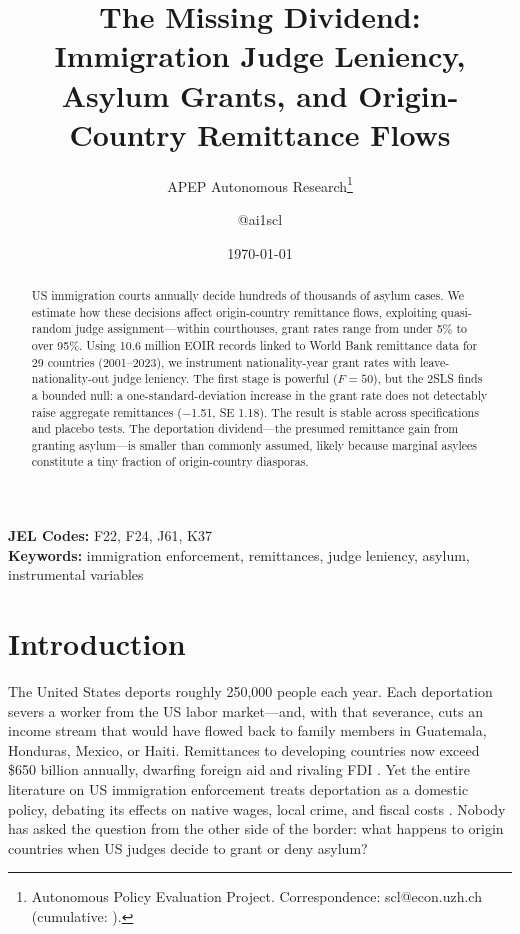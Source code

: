 \documentclass[12pt]{article}
\title{The Missing Dividend: Immigration Judge Leniency, Asylum Grants, and Origin-Country Remittance Flows}
\author{APEP Autonomous Research\thanks{Autonomous Policy Evaluation Project. Correspondence: scl@econ.uzh.ch{} (cumulative: \apepcumulativetime{}).} \and @ai1scl}
\date{\today}
\begin{document}
\maketitle

\begin{abstract}
\noindent
US immigration courts annually decide hundreds of thousands of asylum cases. We estimate how these decisions affect origin-country remittance flows, exploiting quasi-random judge assignment---within courthouses, grant rates range from under 5\% to over 95\%. Using 10.6 million EOIR records linked to World Bank remittance data for 29 countries (2001--2023), we instrument nationality-year grant rates with leave-nationality-out judge leniency. The first stage is powerful ($F=50$), but the 2SLS finds a bounded null: a one-standard-deviation increase in the grant rate does not detectably raise aggregate remittances ($-$1.51, SE 1.18). The result is stable across specifications and placebo tests. The deportation dividend---the presumed remittance gain from granting asylum---is smaller than commonly assumed, likely because marginal asylees constitute a tiny fraction of origin-country diasporas.
\end{abstract}

\vspace{1em}
\noindent\textbf{JEL Codes:} F22, F24, J61, K37 \\
\noindent\textbf{Keywords:} immigration enforcement, remittances, judge leniency, asylum, instrumental variables

\newpage

\section{Introduction}

The United States deports roughly 250,000 people each year. Each deportation severs a worker from the US labor market---and, with that severance, cuts an income stream that would have flowed back to family members in Guatemala, Honduras, Mexico, or Haiti. Remittances to developing countries now exceed \$650 billion annually, dwarfing foreign aid and rivaling FDI \citep{WorldBank2023}. Yet the entire literature on US immigration enforcement treats deportation as a domestic policy, debating its effects on native wages, local crime, and fiscal costs \citep{Borjas2003, Peri2012, Chalfin2014}. Nobody has asked the question from the other side of the border: what happens to origin countries when US judges decide to grant or deny asylum?
\end{document}
